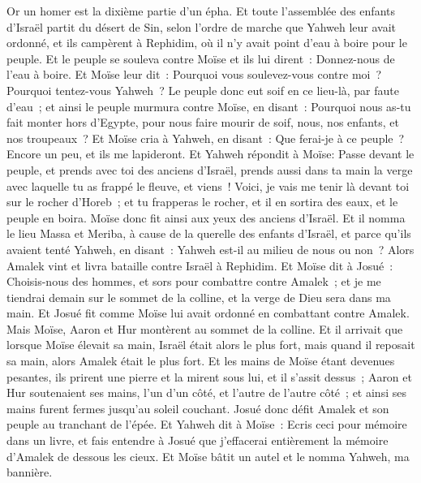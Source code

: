 \begin{multicols}{2}
Or un homer est la dixième partie d'un épha.
\VerseOne{}Et toute l'assemblée des enfants d'Israël partit du désert de Sin, selon l'ordre de marche que Yahweh leur avait ordonné, et ils campèrent à Rephidim, où il n'y avait point d'eau à boire pour le peuple.
Et le peuple se souleva contre Moïse et ils lui dirent~: Donnez-nous de l'eau à boire. Et Moïse leur dit~: Pourquoi vous soulevez-vous contre moi~? Pourquoi tentez-vous Yahweh~?
Le peuple donc eut soif en ce lieu-là, par faute d'eau~; et ainsi le peuple murmura contre Moïse, en disant~: Pourquoi nous as-tu fait monter hors d'Egypte, pour nous faire mourir de soif, nous, nos enfants, et nos troupeaux~?
Et Moïse cria à Yahweh, en disant~: Que ferai-je à ce peuple~? Encore un peu, et ils me lapideront.
Et Yahweh répondit à Moïse: Passe devant le peuple, et prends avec toi des anciens d'Israël, prends aussi dans ta main la verge avec laquelle tu as frappé le fleuve, et viens~!
Voici, je vais me tenir là devant toi sur le rocher d'Horeb~; et tu frapperas le rocher, et il en sortira des eaux, et le peuple en boira. Moïse donc fit ainsi aux yeux des anciens d'Israël.
Et il nomma le lieu Massa et Meriba, à cause de la querelle des enfants d'Israël, et parce qu'ils avaient tenté Yahweh, en disant~: Yahweh est-il au milieu de nous ou non~?
Alors Amalek vint et livra bataille contre Israël à Rephidim.
Et Moïse dit à Josué~: Choisis-nous des hommes, et sors pour combattre contre Amalek~; et je me tiendrai demain sur le sommet de la colline, et la verge de Dieu sera dans ma main.
Et Josué fit comme Moïse lui avait ordonné en combattant contre Amalek. Mais Moïse, Aaron et Hur montèrent au sommet de la colline.
Et il arrivait que lorsque Moïse élevait sa main, Israël était alors le plus fort, mais quand il reposait sa main, alors Amalek était le plus fort.
Et les mains de Moïse étant devenues pesantes, ils prirent une pierre et la mirent sous lui, et il s'assit dessus~; Aaron et Hur soutenaient ses mains, l'un d'un côté, et l'autre de l'autre côté~; et ainsi ses mains furent fermes jusqu'au soleil couchant.
Josué donc défit Amalek et son peuple au tranchant de l'épée.
Et Yahweh dit à Moïse~: Ecris ceci pour mémoire dans un livre, et fais entendre à Josué que j'effacerai entièrement la mémoire d'Amalek de dessous les cieux.
Et Moïse bâtit un autel et le nomma Yahweh, ma bannière.

\end{multicols}
